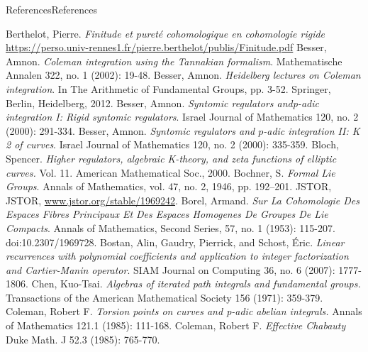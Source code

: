 \documentclass[10pt,]{book}
\numberwithin{equation}{section}
\begin{document}
\begin{references-chapter-numberless}{References}{}{References}{}{}
\begin{thebibliography}{9}
\hypertarget{bib-berth2}{}Berthelot, Pierre.  \textit{Finitude et pureté cohomologique en cohomologie rigide} \url{https://perso.univ-rennes1.fr/pierre.berthelot/publis/Finitude.pdf}
\hypertarget{bib-besser-coleman-tannakian}{}Besser, Amnon. \textit{Coleman integration using the Tannakian formalism}. Mathematische Annalen 322, no. 1 (2002): 19-48.
\hypertarget{bib-besser-coleman-heidelberg}{}Besser, Amnon. \textit{Heidelberg lectures on Coleman integration}. In The Arithmetic of Fundamental Groups, pp. 3-52. Springer, Berlin, Heidelberg, 2012.
\hypertarget{bib-besser-syntomic-I}{}Besser, Amnon. \textit{Syntomic regulators andp-adic integration I: Rigid syntomic regulators}. Israel Journal of Mathematics 120, no. 2 (2000): 291-334.
\hypertarget{bib-besser-syntomic-II}{}Besser, Amnon. \textit{Syntomic regulators and \(p\)-adic integration II: K 2 of curves}. Israel Journal of Mathematics 120, no. 2 (2000): 335-359.
\hypertarget{bib-bloch}{}Bloch, Spencer.  \textit{Higher regulators, algebraic K-theory, and zeta functions of elliptic curves.} Vol. 11. American Mathematical Soc., 2000.
\hypertarget{bib-bochner-formal}{}Bochner, S. \textit{Formal Lie Groups}. Annals of Mathematics, vol. 47, no. 2, 1946, pp. 192–201. JSTOR, JSTOR, \url{www.jstor.org/stable/1969242}.
\hypertarget{bib-borel-hopf}{}Borel, Armand. \textit{Sur La Cohomologie Des Espaces Fibres Principaux Et Des Espaces Homogenes De Groupes De Lie Compacts}. Annals of Mathematics, Second Series, 57, no. 1 (1953): 115-207. doi:10.2307/1969728.
\hypertarget{bib-bostan-gaudry-schost}{}Bostan, Alin, Gaudry, Pierrick, and Schost, Éric. \textit{Linear recurrences with polynomial coefficients and application to integer factorization and Cartier-Manin operator}. SIAM Journal on Computing 36, no. 6 (2007): 1777-1806.
\hypertarget{bib-chen}{}Chen, Kuo-Tsai.  \textit{Algebras of iterated path integrals and fundamental groups.} Transactions of the American Mathematical Society 156 (1971): 359-379.
\hypertarget{bib-coleman-torsion}{}Coleman, Robert F.  \textit{Torsion points on curves and p-adic abelian integrals.} Annals of Mathematics 121.1 (1985): 111-168.
\hypertarget{bib-coleman-chabauty}{}Coleman, Robert F.  \textit{Effective Chabauty} Duke Math. J 52.3 (1985): 765-770.

\end{thebibliography}
\end{references-chapter-numberless}
\end{document}
